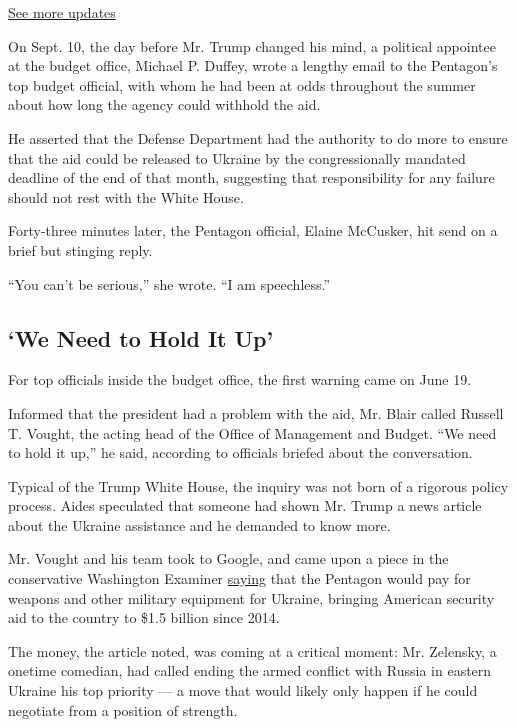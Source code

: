 \href{https://www.nytimes.com/2020/07/31/us/elections/biden-vs-trump.html?action=click\&pgtype=Article\&state=default\&region=MAIN_CONTENT_1\&context=storylines_live_updates}{See
more updates}

On Sept. 10, the day before Mr. Trump changed his mind, a political
appointee at the budget office, Michael P. Duffey, wrote a lengthy email
to the Pentagon's top budget official, with whom he had been at odds
throughout the summer about how long the agency could withhold the aid.

He asserted that the Defense Department had the authority to do more to
ensure that the aid could be released to Ukraine by the congressionally
mandated deadline of the end of that month, suggesting that
responsibility for any failure should not rest with the White House.

Forty-three minutes later, the Pentagon official, Elaine McCusker, hit
send on a brief but stinging reply.

``You can't be serious,'' she wrote. ``I am speechless.''

\hypertarget{we-need-to-hold-it-up}{%
\subsection{`We Need to Hold It Up'}\label{we-need-to-hold-it-up}}

For top officials inside the budget office, the first warning came on
June 19.

Informed that the president had a problem with the aid, Mr. Blair called
Russell T. Vought, the acting head of the Office of Management and
Budget. ``We need to hold it up,'' he said, according to officials
briefed about the conversation.

Typical of the Trump White House, the inquiry was not born of a rigorous
policy process. Aides speculated that someone had shown Mr. Trump a news
article about the Ukraine assistance and he demanded to know more.

Mr. Vought and his team took to Google, and came upon a piece in the
conservative Washington Examiner
\href{https://www.washingtonexaminer.com/policy/defense-national-security/pentagon-to-send-250m-in-weapons-to-ukraine}{saying}
that the Pentagon would pay for weapons and other military equipment for
Ukraine, bringing American security aid to the country to \$1.5 billion
since 2014.

The money, the article noted, was coming at a critical moment: Mr.
Zelensky, a onetime comedian, had called ending the armed conflict with
Russia in eastern Ukraine his top priority --- a move that would likely
only happen if he could negotiate from a position of strength.

